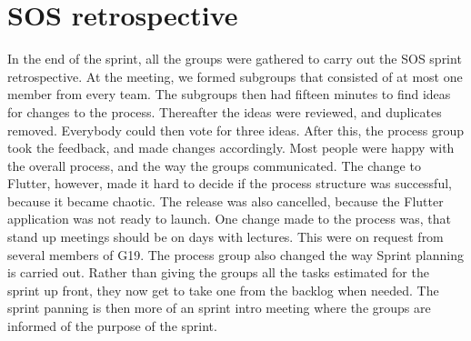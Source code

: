 \section{SOS retrospective}
In the end of the sprint, all the groups were gathered to carry out the SOS sprint retrospective. 
At the meeting, we formed subgroups that consisted of at most one member from every team. 
The subgroups then had fifteen minutes to find ideas for changes to the process. 
Thereafter the ideas were reviewed, and duplicates removed. Everybody could then vote for three ideas. 
After this, the process group took the feedback, and made changes accordingly. 
Most people were happy with the overall process, and the way the groups communicated. 
The change to Flutter, however, made it hard to decide if the process structure was successful, because it became chaotic.
The release was also cancelled, because the Flutter application was not ready to launch. 
One change made to the process was, that stand up meetings should be on days with lectures. 
This were on request from several members of G19. 
The process group also changed the way Sprint planning is carried out.
Rather than giving the groups all the tasks estimated for the sprint up front, they now get to take one from the backlog when needed. 
The sprint panning is then more of an sprint intro meeting where the groups are informed of the purpose of the sprint. 